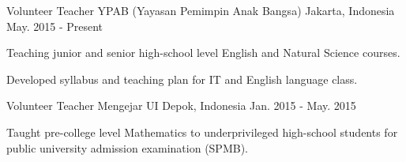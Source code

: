 

\begin{cventries}

  \cventry
    {Volunteer Teacher} %
    {YPAB (Yayasan Pemimpin Anak Bangsa)} %
    {Jakarta, Indonesia} %
    {May. 2015 - Present} %
    {
      \begin{cvitems} %
        \item {Teaching junior and senior high-school level English and Natural Science courses.}
        \item {Developed syllabus and teaching plan for IT and English language class.}
      \end{cvitems}
    }

  \cventry
    {Volunteer Teacher} %
    {Mengejar UI} %
    {Depok, Indonesia} %
    {Jan. 2015 - May. 2015} %
    {
      \begin{cvitems} %
        \item {Taught pre-college level Mathematics to underprivileged high-school students for public university admission examination (SPMB).}
      \end{cvitems}
    }

\end{cventries}
